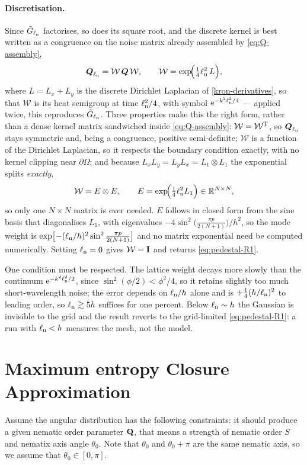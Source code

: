 \documentclass[a5paper]{article}
\begin{document}
\paragraph{Discretisation.} Since $\tilde G_{\ell_{\rm n}}$ factorises, so does its square root, and the discrete kernel is best written as a congruence on the noise matrix already assembled by \eqref{eq:Q-assembly},
\begin{equation}
    \label{eq:Q-smoothed}
    \boldsymbol Q_{\ell_{\rm n}} = \mathcal{W}\,\boldsymbol Q\,\mathcal{W},
    \qquad
    \mathcal{W} = \exp\!\Bigl(\tfrac{1}{4}\ell_{\rm n}^2\,L\Bigr),
\end{equation}
where $L = L_x+L_y$ is the discrete Dirichlet Laplacian of \eqref{kron-derivatives}, so that $\mathcal W$ is its heat semigroup at time $\ell_{\rm n}^2/4$, with symbol $\mathrm{e}^{-k^2\ell_{\rm n}^2/4}$ --- applied twice, this reproduces $\tilde G_{\ell_{\rm n}}$. Three properties make this the right form, rather than a dense kernel matrix sandwiched inside \eqref{eq:Q-assembly}: $\mathcal W=\mathcal W^{\mathrm{T}}$, so $\boldsymbol Q_{\ell_{\rm n}}$ stays symmetric and, being a congruence, positive semi-definite; $\mathcal W$ is a function of the Dirichlet Laplacian, so it respects the boundary condition exactly, with no kernel clipping near $\partial\Omega$; and because $L_xL_y = L_yL_x = L_1\otimes L_1$ the exponential splits \emph{exactly},
\begin{equation}
    \label{eq:W-factorised}
    \mathcal{W} = E\otimes E,
    \qquad
    E = \exp\!\Bigl(\tfrac{1}{4}\ell_{\rm n}^2 L_1\Bigr) \in\mathbb{R}^{N\times N},
\end{equation}
so only one $N\times N$ matrix is ever needed. $E$ follows in closed form from the sine basis that diagonalises $L_1$, with eigenvalues $-4\sin^2\bigl(\tfrac{\pi p}{2(N+1)}\bigr)/h^2$, so the mode weight is $\exp\bigl[-(\ell_{\rm n}/h)^2\sin^2\tfrac{\pi p}{2(N+1)}\bigr]$ and no matrix exponential need be computed numerically. Setting $\ell_{\rm n}=0$ gives $\mathcal W=\boldsymbol{\mathrm{I}}$ and returns \eqref{eq:pedestal-R1}.

One condition must be respected. The lattice weight decays more slowly than the continuum $\mathrm{e}^{-k^2\ell_{\rm n}^2/2}$, since $\sin^2(\phi/2)<\phi^2/4$, so it retains slightly too much short-wavelength noise; the error depends on $\ell_{\rm n}/h$ alone and is $+\tfrac14(h/\ell_{\rm n})^2$ to leading order, so $\ell_{\rm n}\gtrsim5h$ suffices for one percent. Below $\ell_{\rm n}\sim h$ the Gaussian is invisible to the grid and the result reverts to the grid-limited \eqref{eq:pedestal-R1}: a run with $\ell_{\rm n}<h$ measures the mesh, not the model.


\section{Maximum entropy Closure Approximation}
\label{sec-maxent}
Assume the angular distribution has the following constraints: it should produce a given nematic order parameter $\mathbf{Q}$, that means a strength of nematic order $S$ and nematix axis angle $\theta_0$. Note that $\theta_0$ and $\theta_0+\pi$ are the same nematic axis, so we assume that $\theta_0 \in [0, \pi]$.
\end{document}
